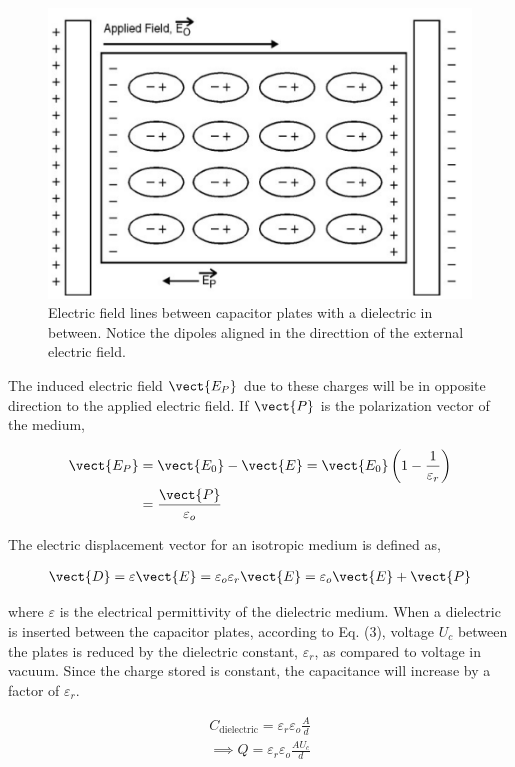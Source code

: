 \begin{figure}[H]
    \centering
    \includegraphics[width=0.8\columnwidth]{images/f3.png}
    \caption{Electric field lines between capacitor plates with a dielectric in between. Notice the dipoles aligned in the directtion of the external electric field.}
    \label{fig:2}
\end{figure}

The induced electric field $\vect{E_P}$ due to these charges will be in opposite direction to the applied electric field. If $\vect{P}$ is the polarization vector of the medium,

\begin{align}
    \vect{E_P} &= \vect{E_0} - \vect{E} = \vect{E_0} \left(1 - \frac{1}{\varepsilon_r}\right) \nonumber\\
    &= \frac{\vect{P}}{\varepsilon_o}
\end{align}

The electric displacement vector for an isotropic medium is defined as,

\begin{align}
    \vect{D} = \varepsilon \vect{E} = \varepsilon_o \varepsilon_r \vect{E} = \varepsilon_o \vect{E} + \vect{P}
\end{align}

where $\varepsilon$ is the electrical permittivity of the dielectric medium. When a dielectric is inserted between the capacitor plates, according to Eq. (3), voltage $U_c$ between the plates is reduced by the dielectric constant, $\varepsilon_r$, as compared to voltage in vacuum. Since the charge stored is constant, the capacitance will increase by a factor of $\varepsilon_r$.

\begin{align}
    C_\text{dielectric} = \varepsilon_r \varepsilon_o \frac{A}{d}\\
    \implies Q = \varepsilon_r \varepsilon_o \frac{AU_c}{d} 
\end{align}

